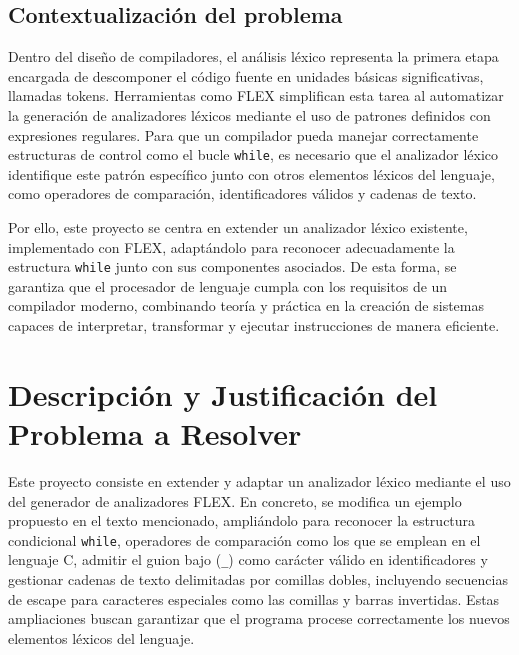 \documentclass{article}
\begin{document}
\subsection{Contextualización del problema}

Dentro del diseño de compiladores, el análisis léxico representa la primera etapa encargada de descomponer el código fuente en unidades básicas significativas, llamadas tokens. Herramientas como FLEX simplifican esta tarea al automatizar la generación de analizadores léxicos mediante el uso de patrones definidos con expresiones regulares. Para que un compilador pueda manejar correctamente estructuras de control como el bucle \texttt{while}, es necesario que el analizador léxico identifique este patrón específico junto con otros elementos léxicos del lenguaje, como operadores de comparación, identificadores válidos y cadenas de texto.

Por ello, este proyecto se centra en extender un analizador léxico existente, implementado con FLEX, adaptándolo para reconocer adecuadamente la estructura \texttt{while} junto con sus componentes asociados. De esta forma, se garantiza que el procesador de lenguaje cumpla con los requisitos de un compilador moderno, combinando teoría y práctica en la creación de sistemas capaces de interpretar, transformar y ejecutar instrucciones de manera eficiente.



\section{Descripción y Justificación del Problema a Resolver}\label{sec:descr}

Este proyecto consiste en extender y adaptar un analizador léxico mediante el uso del generador de analizadores FLEX. En concreto, se modifica un ejemplo propuesto en el texto mencionado, ampliándolo para reconocer la estructura condicional \texttt{while}, operadores de comparación como los que se emplean en el lenguaje C, admitir el guion bajo (\texttt{\_}) como carácter válido en identificadores y gestionar cadenas de texto delimitadas por comillas dobles, incluyendo secuencias de escape para caracteres especiales como las comillas y barras invertidas. Estas ampliaciones buscan garantizar que el programa procese correctamente los nuevos elementos léxicos del lenguaje.
\end{document}
